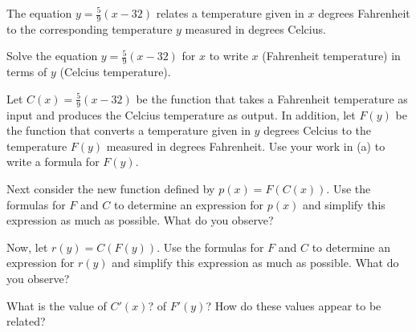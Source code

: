 \begin{pa} \label{PA:2.8}
The equation $y = \frac{5}{9}(x-32)$ relates a temperature given in $x$ degrees Fahrenheit to the corresponding temperature $y$ measured in degrees Celcius.  
\ba
	\item Solve the equation $y = \frac{5}{9}(x-32)$ for $x$ to write $x$ (Fahrenheit temperature) in terms of $y$ (Celcius temperature).
	\item Let $C(x) = \frac{5}{9}(x-32)$ be the function that takes a Fahrenheit temperature as input and produces the Celcius temperature as output.  In addition,  let $F(y)$ be the function that converts a temperature given in $y$ degrees Celcius to the temperature $F(y)$ measured in degrees Fahrenheit.  Use your work in (a) to write a formula for $F(y)$.
	\item Next consider the new function defined by $p(x) = F(C(x))$.  Use the formulas for $F$ and $C$ to determine an expression for $p(x)$ and simplify this expression as much as possible.  What do you observe?
	\item Now, let $r(y) = C(F(y))$.  Use the formulas for $F$ and $C$ to determine an expression for $r(y)$ and simplify this expression as much as possible.  What do you observe?
	\item What is the value of $C'(x)$?  of $F'(y)$?  How do these values appear to be related?
\ea
\end{pa} 
\afterpa